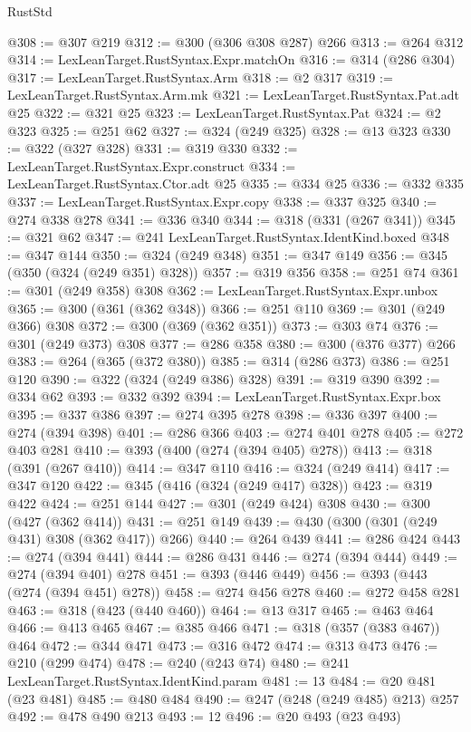 \begin{lexlean}{RustStd}
\begin{coremodule}
{\begin{coremodule}
{{{{{{{@308 := @307 @219
@312 := @300 (@306 @308 @287) @266
@313 := @264 @312
@314 := LexLeanTarget.RustSyntax.Expr.matchOn
@316 := @314 (@286 @304)
@317 := LexLeanTarget.RustSyntax.Arm
@318 := @2 @317
@319 := LexLeanTarget.RustSyntax.Arm.mk
@321 := LexLeanTarget.RustSyntax.Pat.adt @25
@322 := @321 @25
@323 := LexLeanTarget.RustSyntax.Pat
@324 := @2 @323
@325 := @251 @62
@327 := @324 (@249 @325)
@328 := @13 @323
@330 := @322 (@327 @328)
@331 := @319 @330
@332 := LexLeanTarget.RustSyntax.Expr.construct
@334 := LexLeanTarget.RustSyntax.Ctor.adt @25
@335 := @334 @25
@336 := @332 @335
@337 := LexLeanTarget.RustSyntax.Expr.copy
@338 := @337 @325
@340 := @274 @338 @278
@341 := @336 @340
@344 := @318 (@331 (@267 @341))
@345 := @321 @62
@347 := @241 LexLeanTarget.RustSyntax.IdentKind.boxed
@348 := @347 @144
@350 := @324 (@249 @348)
@351 := @347 @149
@356 := @345 (@350 (@324 (@249 @351) @328))
@357 := @319 @356
@358 := @251 @74
@361 := @301 (@249 @358) @308
@362 := LexLeanTarget.RustSyntax.Expr.unbox
@365 := @300 (@361 (@362 @348))
@366 := @251 @110
@369 := @301 (@249 @366) @308
@372 := @300 (@369 (@362 @351))
@373 := @303 @74
@376 := @301 (@249 @373) @308
@377 := @286 @358
@380 := @300 (@376 @377) @266
@383 := @264 (@365 (@372 @380))
@385 := @314 (@286 @373)
@386 := @251 @120
@390 := @322 (@324 (@249 @386) @328)
@391 := @319 @390
@392 := @334 @62
@393 := @332 @392
@394 := LexLeanTarget.RustSyntax.Expr.box
@395 := @337 @386
@397 := @274 @395 @278
@398 := @336 @397
@400 := @274 (@394 @398)
@401 := @286 @366
@403 := @274 @401 @278
@405 := @272 @403 @281
@410 := @393 (@400 (@274 (@394 @405) @278))
@413 := @318 (@391 (@267 @410))
@414 := @347 @110
@416 := @324 (@249 @414)
@417 := @347 @120
@422 := @345 (@416 (@324 (@249 @417) @328))
@423 := @319 @422
@424 := @251 @144
@427 := @301 (@249 @424) @308
@430 := @300 (@427 (@362 @414))
@431 := @251 @149
@439 := @430 (@300 (@301 (@249 @431) @308 (@362 @417)) @266)
@440 := @264 @439
@441 := @286 @424
@443 := @274 (@394 @441)
@444 := @286 @431
@446 := @274 (@394 @444)
@449 := @274 (@394 @401) @278
@451 := @393 (@446 @449)
@456 := @393 (@443 (@274 (@394 @451) @278))
@458 := @274 @456 @278
@460 := @272 @458 @281
@463 := @318 (@423 (@440 @460))
@464 := @13 @317
@465 := @463 @464
@466 := @413 @465
@467 := @385 @466
@471 := @318 (@357 (@383 @467)) @464
@472 := @344 @471
@473 := @316 @472
@474 := @313 @473
@476 := @210 (@299 @474)
@478 := @240 (@243 @74)
@480 := @241 LexLeanTarget.RustSyntax.IdentKind.param
@481 := 13
@484 := @20 @481 (@23 @481)
@485 := @480 @484
@490 := @247 (@248 (@249 @485) @213) @257
@492 := @478 @490 @213
@493 := 12
@496 := @20 @493 (@23 @493)
}}}}}}}
\end{coremodule}}
\end{coremodule}
\end{lexlean}

